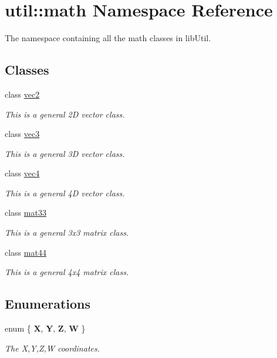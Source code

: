 \hypertarget{namespaceutil_1_1math}{\section{util\-:\-:math \-Namespace \-Reference}
\label{namespaceutil_1_1math}
}


\-The namespace containing all the math classes in lib\-Util.  


\subsection*{\-Classes}
\begin{DoxyCompactItemize}
\item 
class \hyperlink{classutil_1_1math_1_1vec2}{vec2}
\begin{DoxyCompactList}\small\item\em \-This is a general 2\-D vector class. \end{DoxyCompactList}\item 
class \hyperlink{classutil_1_1math_1_1vec3}{vec3}
\begin{DoxyCompactList}\small\item\em \-This is a general 3\-D vector class. \end{DoxyCompactList}\item 
class \hyperlink{classutil_1_1math_1_1vec4}{vec4}
\begin{DoxyCompactList}\small\item\em \-This is a general 4\-D vector class. \end{DoxyCompactList}\item 
class \hyperlink{classutil_1_1math_1_1mat33}{mat33}
\begin{DoxyCompactList}\small\item\em \-This is a general 3x3 matrix class. \end{DoxyCompactList}\item 
class \hyperlink{classutil_1_1math_1_1mat44}{mat44}
\begin{DoxyCompactList}\small\item\em \-This is a general 4x4 matrix class. \end{DoxyCompactList}\end{DoxyCompactItemize}
\subsection*{\-Enumerations}
\begin{DoxyCompactItemize}
\item 
enum \{ {\bfseries \-X}, 
{\bfseries \-Y}, 
{\bfseries \-Z}, 
{\bfseries \-W}
 \}
\begin{DoxyCompactList}\small\item\em \-The \-X,\-Y,\-Z,\-W coordinates. \end{DoxyCompactList}\end{DoxyCompactItemize}
